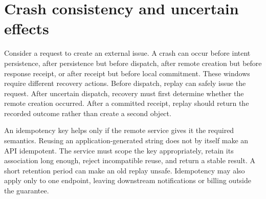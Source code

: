\section{Crash consistency and uncertain effects}\label{sec:C20:crashes}
Consider a request to create an external issue. A crash can occur before intent persistence, after persistence but before dispatch, after remote creation but before response receipt, or after receipt but before local commitment. These windows require different recovery actions. Before dispatch, replay can safely issue the request. After uncertain dispatch, recovery must first determine whether the remote creation occurred. After a committed receipt, replay should return the recorded outcome rather than create a second object.

An idempotency key helps only if the remote service gives it the required semantics. Reusing an application-generated string does not by itself make an API idempotent. The service must scope the key appropriately, retain its association long enough, reject incompatible reuse, and return a stable result. A short retention period can make an old replay unsafe. Idempotency may also apply only to one endpoint, leaving downstream notifications or billing outside the guarantee.

